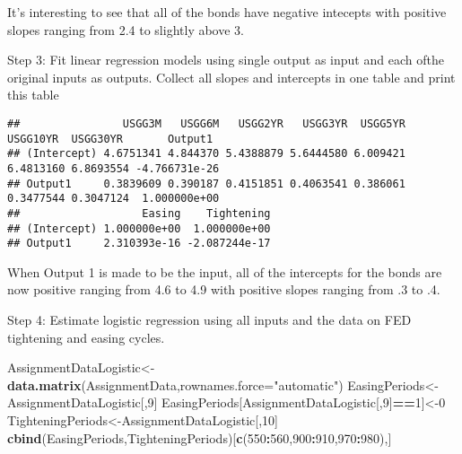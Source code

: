 \documentclass[]{article}
\newenvironment{Shaded}{\begin{snugshade}}{\end{snugshade}}
\newcommand{\KeywordTok}[1]{\textcolor[rgb]{0.13,0.29,0.53}{\textbf{#1}}}
\newcommand{\DataTypeTok}[1]{\textcolor[rgb]{0.13,0.29,0.53}{#1}}
\newcommand{\DecValTok}[1]{\textcolor[rgb]{0.00,0.00,0.81}{#1}}
\newcommand{\StringTok}[1]{\textcolor[rgb]{0.31,0.60,0.02}{#1}}
\newcommand{\ControlFlowTok}[1]{\textcolor[rgb]{0.13,0.29,0.53}{\textbf{#1}}}
\newcommand{\OperatorTok}[1]{\textcolor[rgb]{0.81,0.36,0.00}{\textbf{#1}}}
\newcommand{\NormalTok}[1]{#1}
\begin{document}
It's interesting to see that all of the bonds have negative intecepts
with positive slopes ranging from 2.4 to slightly above 3.

Step 3: Fit linear regression models using single output as input and
each ofthe original inputs as outputs. Collect all slopes and intercepts
in one table and print this table

\begin{Shaded}
\end{Shaded}

\begin{verbatim}
##                USGG3M   USGG6M   USGG2YR   USGG3YR  USGG5YR  USGG10YR  USGG30YR       Output1
## (Intercept) 4.6751341 4.844370 5.4388879 5.6444580 6.009421 6.4813160 6.8693554 -4.766731e-26
## Output1     0.3839609 0.390187 0.4151851 0.4063541 0.386061 0.3477544 0.3047124  1.000000e+00
##                   Easing    Tightening
## (Intercept) 1.000000e+00  1.000000e+00
## Output1     2.310393e-16 -2.087244e-17
\end{verbatim}

When Output 1 is made to be the input, all of the intercepts for the
bonds are now positive ranging from 4.6 to 4.9 with positive slopes
ranging from .3 to .4.

Step 4: Estimate logistic regression using all inputs and the data on
FED tightening and easing cycles.

\begin{Shaded}
\begin{Highlighting}[]
\NormalTok{AssignmentDataLogistic<-}\KeywordTok{data.matrix}\NormalTok{(AssignmentData,}\DataTypeTok{rownames.force=}\StringTok{"automatic"}\NormalTok{)}
\NormalTok{EasingPeriods<-AssignmentDataLogistic[,}\DecValTok{9}\NormalTok{]}
\NormalTok{EasingPeriods[AssignmentDataLogistic[,}\DecValTok{9}\NormalTok{]}\OperatorTok{==}\DecValTok{1}\NormalTok{]<-}\DecValTok{0}
\NormalTok{TighteningPeriods<-AssignmentDataLogistic[,}\DecValTok{10}\NormalTok{]}
\KeywordTok{cbind}\NormalTok{(EasingPeriods,TighteningPeriods)[}\KeywordTok{c}\NormalTok{(}\DecValTok{550}\OperatorTok{:}\DecValTok{560}\NormalTok{,}\DecValTok{900}\OperatorTok{:}\DecValTok{910}\NormalTok{,}\DecValTok{970}\OperatorTok{:}\DecValTok{980}\NormalTok{),]}
\end{Highlighting}
\end{Shaded}
\end{document}
